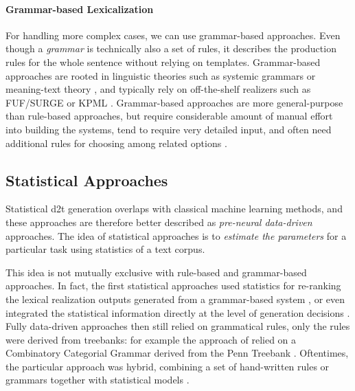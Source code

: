 \paragraph{Grammar-based Lexicalization} For handling more complex cases, we can use grammar-based approaches. Even though a \emph{grammar} is technically also a set of rules, it describes the production rules for the whole sentence without relying on templates.
Grammar-based approaches are rooted in linguistic theories such as systemic grammars \cite{halliday1985systemic,matthiessen1991lexico} or meaning-text theory \cite{mel1988dependency,goldberg1994using,milleModD2TMultilayerDataset2023}, and typically rely on off-the-shelf realizers such as FUF/SURGE \cite{elhadad1997surge} or KPML \cite{bateman1997enabling}. Grammar-based approaches are more general-purpose than rule-based approaches, but require considerable amount of manual effort into building the systems, tend to require very detailed
input, and often need additional rules for choosing among related options \cite{gattSurveyStateArt2018}.


\subsection{Statistical Approaches}
\label{sec:stat-d2t}

Statistical \ac{d2t} generation overlaps with classical machine learning methods, and these approaches are therefore better described as \emph{pre-neural data-driven} approaches. The idea of statistical approaches is to \emph{estimate the parameters} for a particular task using statistics of a text corpus.

This idea is not mutually exclusive with rule-based and grammar-based approaches. In fact, the first statistical approaches used statistics for re-ranking the lexical realization outputs generated from a grammar-based system \cite{bangalore2000corpus,langkilde2000forest,ratnaparkhi2000trainable}, or even integrated the statistical information directly at the level of generation decisions \cite{belz2008automatic}. Fully data-driven approaches then still relied on grammatical rules, only the rules were derived from treebanks: for example the approach of \citet{white2007towards} relied on a Combinatory Categorial Grammar \cite{steedman2001syntactic} derived from the Penn Treebank \cite{hockenmaier2007ccgbank}. Oftentimes, the particular approach was hybrid, combining a set of hand-written rules or grammars together with statistical models \cite{konstas2012concept,gardent2017statistical}.

